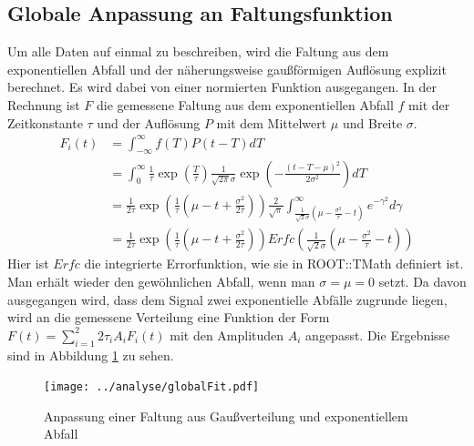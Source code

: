 \documentclass[a4paper,12pt]{article}
\begin{document}
\subsection{Globale Anpassung an Faltungsfunktion}
Um alle Daten auf einmal zu beschreiben, wird die Faltung aus dem exponentiellen Abfall und der
näherungsweise gaußförmigen Auflösung explizit berechnet.
Es wird dabei von einer normierten Funktion ausgegangen.
In der Rechnung ist $F$ die gemessene Faltung aus dem exponentiellen Abfall $f$ mit der
Zeitkonstante $τ$ und der Auflösung $P$ mit dem Mittelwert $μ$ und Breite $σ$.
\begin{align*}
	F_i(t) &= \int_{-\infty}^\infty f(T)P(t-T)dT\\
	&= \int_0^\infty \frac{1}{τ}\exp\left( \frac{T}{τ} \right)\frac{1}{\sqrt{2π}σ}\exp\left( -\frac{(t-T-μ)^2}{2σ^2} \right)dT\\
	&= \frac{1}{2τ} \exp\left( \frac{1}{τ}\left( μ-t+\frac{σ^2}{2τ} \right) \right) \frac{2}{\sqrt{π}}\int_{\frac{1}{\sqrt{2}σ}\left( μ-\frac{σ^2}{τ} -t \right)}^\infty  e^{-γ^2}dγ\\
	&= \frac{1}{2τ} \exp\left( \frac{1}{τ}\left( μ-t+\frac{σ^2}{2τ} \right) \right) Erfc\left(\frac{1}{\sqrt{2}σ}\left( μ-\frac{σ^2}{τ} -t \right)\right)
\end{align*}
Hier ist $Erfc$ die integrierte Errorfunktion, wie sie in ROOT::TMath definiert ist. Man erhält
wieder den gewöhnlichen Abfall, wenn man $σ=μ=0$ setzt.
Da davon ausgegangen wird, dass dem Signal zwei exponentielle Abfälle zugrunde liegen, wird an die
gemessene Verteilung eine Funktion der Form $F(t) = \sum_{i=1}^2 2τ_iA_i F_i(t)$ mit den Amplituden
$A_i$ angepasst. Die Ergebnisse sind in Abbildung \ref{fig:globalFit} zu sehen.

\begin{figure}[htb]
	\centering
	\texttt{[image: ../analyse/globalFit.pdf]}
	\caption{Anpassung einer Faltung aus Gaußverteilung und exponentiellem Abfall}
	\label{fig:globalFit}
\end{figure}
\end{document}
